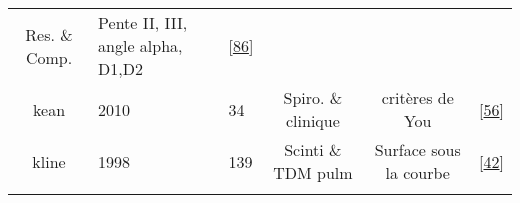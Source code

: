 \documentclass[12pt,]{article}
\begin{document}
\begin{landscape}
\begin{longtable}[]{@{}cllccl@{}}
\begin{minipage}[t]{0.14\columnwidth}
Res. \& Comp.\strut
\end{minipage} & \begin{minipage}[t]{0.40\columnwidth}\centering
Pente II, III, angle alpha, D1,D2\strut
\end{minipage} & \begin{minipage}[t]{0.08\columnwidth}\raggedright
{[}\protect\hyperlink{ref-ioan2014frequency}{86}{]}\strut
\end{minipage}\tabularnewline
\begin{minipage}[t]{0.09\columnwidth}\centering
kean\strut
\end{minipage} & \begin{minipage}[t]{0.05\columnwidth}\raggedright
2010\strut
\end{minipage} & \begin{minipage}[t]{0.08\columnwidth}\raggedright
34\strut
\end{minipage} & \begin{minipage}[t]{0.14\columnwidth}\centering
Spiro. \& clinique\strut
\end{minipage} & \begin{minipage}[t]{0.40\columnwidth}\centering
8 critères de You\strut
\end{minipage} & \begin{minipage}[t]{0.08\columnwidth}\raggedright
{[}\protect\hyperlink{ref-kean2010feature}{56}{]}\strut
\end{minipage}\tabularnewline
\begin{minipage}[t]{0.09\columnwidth}\centering
kline\strut
\end{minipage} & \begin{minipage}[t]{0.05\columnwidth}\raggedright
1998\strut
\end{minipage} & \begin{minipage}[t]{0.08\columnwidth}\raggedright
139\strut
\end{minipage} & \begin{minipage}[t]{0.14\columnwidth}\centering
Scinti \& TDM pulm\strut
\end{minipage} & \begin{minipage}[t]{0.40\columnwidth}\centering
Surface sous la courbe\strut
\end{minipage} & \begin{minipage}[t]{0.08\columnwidth}\raggedright
{[}\protect\hyperlink{ref-kline1998preliminary}{42}{]}\strut
\end{minipage}\tabularnewline
\begin{minipage}[t]{0.09\columnwidth}\centering

\end{minipage}
\end{longtable}
\end{landscape}
\end{document}
